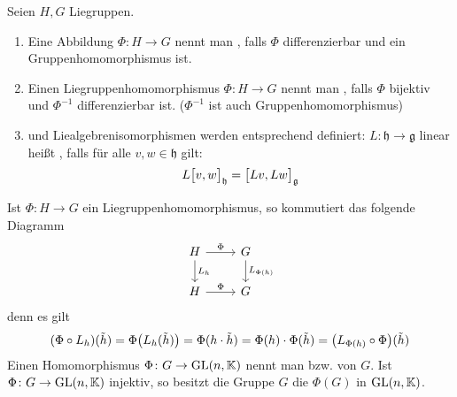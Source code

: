 \begin{definition}[{name=[Liegruppen- und Liealgebrenhomomorphismen]}]
	Seien $H,G$ Liegruppen.
	\begin{enumerate}[1)]
		\item Eine Abbildung $\Phi \colon H \to G$ nennt man , falls $\Phi$ differenzierbar und ein Gruppenhomomorphismus ist.
		\item Einen Liegruppenhomomorphismus $\Phi \colon H \to G$ nennt man , falls $\Phi$ bijektiv und $\Phi^{-1}$ differenzierbar ist. ($\Phi^{-1}$ ist auch Gruppenhomomorphismus)
		\item {} und Liealgebrenisomorphismen werden entsprechend definiert:  $L \colon \mathfrak{h} \to \mathfrak{g}$ linear heißt , falls für alle $v,w \in \mathfrak{h}$ gilt:
		\[
			L \benbrace[\big]{v,w}_{\mathfrak{h}} = \benbrace[\big]{L v, L w}_\mathfrak{g}
		\]
	\end{enumerate}
\end{definition}

Ist $\Phi \colon H \to G$ ein Liegruppenhomomorphismus, so kommutiert das folgende Diagramm
\[
	\begin{tikzcd}
		H \rar["\Phi"] \dar["L_h"] & G \dar["L_{\Phi(h)}"] \\
		H \rar["\Phi"] & G
	\end{tikzcd}
\]
denn es gilt
\begin{align}
	(\Phi \circ L_h)(\tilde{h}) = \Phi \enbrace*{L_h(\tilde{h})} = \Phi(h \cdot \tilde{h}) = \Phi(h) \cdot \Phi(\tilde{h}) = \enbrace*{L_{\Phi(h)} \circ \Phi}(\tilde{h})
\end{align}
Einen Homomorphismus $\Phi \colon G \to \GL(n,\mathbb{K})$ nennt man  bzw.  von $G$.
Ist $\Phi \colon G \to \GL(n,\mathbb{K})$ injektiv, so besitzt die Gruppe $G$ die  $\Phi(G)$ in $\GL(n,\mathbb{K})$.

